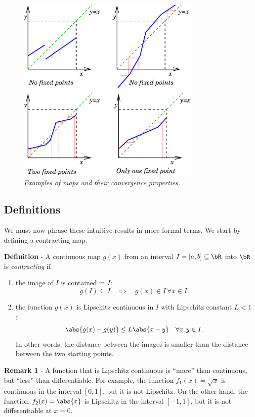 \begin{figure}
  \centerline{\includegraphics[width=90mm]{figures/contract_examples}}
  \caption{\label{fig:contract_examples} \it Examples of maps and
    their convergence properties.}
\end{figure}

\subsection{Definitions}

We must now phrase these intuitive results in more formal terms.   We
start by defining a contracting map.

\noindent
\textbf{Definition} - A continuous map $g(x)$ from an interval
$I=[a,b] \subseteq \bR$ into $\bR$ is \textit{contracting} if
%
\begin{enumerate}
\item the image of $I$ is contained in $I$:
  \begin{equation*}
    g(I) \subseteq I \quad \Leftrightarrow \quad
    g(x) \in I \, \forall x \in I .
  \end{equation*}
\item the function $g(x)$ is Lipschitz continuous in $I$ with
  Lipschitz constant $L < 1$:
  \begin{equation*}
    \abs{ g(x) - g(y) } \le L \abs{ x - y } \quad \forall x,y \in I .
  \end{equation*}
  In other words, the distance between the images is smaller than the
  distance between the two starting points.
\end{enumerate}

\noindent
\textbf{Remark 1} - A function that is Lipschitz continuous is
``more'' than continuous, but ``less'' than differentiable.  For
example, the function $f_1(x)=\sqrt{x}$ is continuous in the interval
$[0,1]$, but it is not Lipschitz.  On the other hand, the function
$f_2(x)=\abs{x}$ is Lipschitz in the interval $[-1,1]$, but it is not
differentiable at $x=0$.

